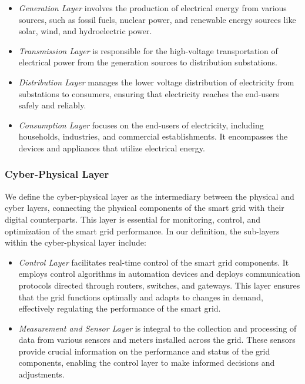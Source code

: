 \documentclass[10pt, journal]{IEEEtran}
\begin{document}
\begin{itemize}
			
\item {\it Generation Layer} involves the production of electrical energy from various sources, such as fossil fuels, nuclear power, and renewable energy sources like solar, wind, and hydroelectric power.

\item {\it Transmission Layer} is responsible for the high-voltage transportation of electrical power from the generation sources to distribution substations.

\item {\it Distribution Layer} manages the lower voltage distribution of electricity from substations to consumers, ensuring that electricity reaches the end-users safely and reliably.

\item {\it Consumption Layer} focuses on the end-users of electricity, including households, industries, and commercial establishments. It encompasses the devices and appliances that utilize electrical energy.

\end{itemize}

\subsubsection{Cyber-Physical Layer}

We define the cyber-physical layer as the intermediary between the physical and cyber layers, connecting the physical components of the smart grid with their digital counterparts. This layer is essential for monitoring, control, and optimization of the smart grid performance. In our definition, the sub-layers within the cyber-physical layer include:

\begin{itemize}

\item {\it Control Layer} facilitates real-time control of the smart grid components. It employs control algorithms in automation devices and deploys communication protocols directed through routers, switches, and gateways. This layer ensures that the grid functions optimally and adapts to changes in demand, effectively regulating the performance of the smart grid.

\item {\it Measurement and Sensor Layer} is integral to the collection and processing of data from various sensors and meters installed across the grid. These sensors provide crucial information on the performance and status of the grid components, enabling the control layer to make informed decisions and adjustments.

\end{itemize}
\end{document}
